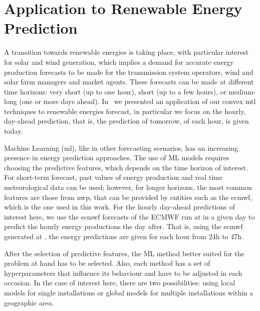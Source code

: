 \section{Application to Renewable Energy Prediction}\label{sec:convexmlt_renewable}

A transition towards renewable energies is taking place, with particular interest for solar and wind generation, which implies a demand for accurate energy production forecasts to be made for the transmission system operators, wind and solar farm managers and market agents. These forecasts can be made at different time horizons: very short (up to one hour), short (up to a few hours), or medium-long (one or more days ahead).
In~\citet{ruiz2020_energies} we presented an application of our convex \acrshort{mtl} techniques to renewable energies forecast, in particular we focus on the hourly, day-ahead prediction, that is, the prediction of tomorrow, of each hour, is given today.

Machine Learning (\acrshort{ml}), like in other forecasting scenarios, has an increasing presence in energy prediction approaches. 
The use of ML models requires choosing the predictive features, which depends on the time horizon of interest. 
For short-term forecast, past values of energy production and real time meteorological data can be used; however, for longer horizons, the most common features are those from \acrfull{nwp}, that can be provided by entities such as the \acrfull{ecmwf}, which is the one used in this work.
For the hourly day-ahead predictions of interest here, we use the \acrshort{ecmwf} forecasts of the ECMWF run at  in a given day to predict the hourly energy productions the day after. That is, using the \acrshort{ecmwf} generated at , the energy predictions are given for each hour from {24}h to {47}h.

After the selection of predictive features, the ML method better suited for the problem at hand has to be selected. Also, each method has a set of hyperparameters that influence its behaviour and have to be adjusted in each occasion.
In the case of interest here, there are two possibilities: using local models for single installations or global models for multiple installations within a geographic area.


